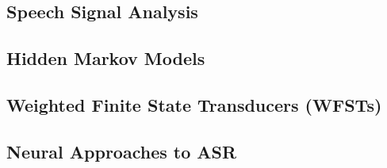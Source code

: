 \documentclass[9pt]{extarticle}
\begin{document}
  \begin{multicols}{2}
  \subsection*{Speech Signal Analysis}
  
  \subsection*{Hidden Markov Models}
  
  \subsection*{Weighted Finite State Transducers (WFSTs)}
  
  \subsection*{Neural Approaches to ASR}
  
  \end{multicols}
\end{document}
